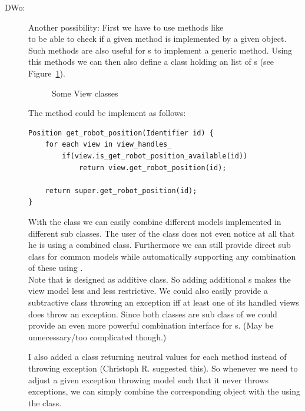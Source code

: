 \begin{appendix}
\begin{resolution}
\begin{description}
	\item  [DWo:] Another possibility: First we have to use methods like \\  to be able to check if a given method is implemented by a given  object. Such methods are also useful for s to implement a generic  method. Using this methods we can then also define a  class holding an list of s (see Figure~\ref{fig:genericview}). 
	
	\begin{figure}
		\centering
		\caption{Some View classes}\label{fig:genericview}
	\end{figure}

	The method  could be implement as follows:

	\lstset{language=C++}
\begin{lstlisting}
Position get_robot_position(Identifier id) {
	for each view in view_handles_
		if(view.is_get_robot_position_available(id))
			return view.get_robot_position(id);
			
	return super.get_robot_position(id);
}
\end{lstlisting}

	With the  class we can easily combine different models implemented in different sub classes. The user of the  class does not even notice at all that he is using a combined class. Furthermore we can still provide direct sub class for common models while automatically supporting any combination of these using . \\
	Note that  is designed as additive class. So adding additional s makes the view model less and less restrictive. We could also easily provide a subtractive class throwing an exception iff at least one of its handled views does throw an exception. Since both classes are sub class of  we could provide an even more powerful combination interface for s. (May be unnecessary/too complicated though.)\par
	I also added a class  returning neutral values for each method instead of throwing exception (Christoph R. suggested this). So whenever we need to adjust a given exception throwing model such that it never throws exceptions, we can simply combine the corresponding  object with the  using the  class.
	

\end{description}
\end{resolution}
\end{appendix}
